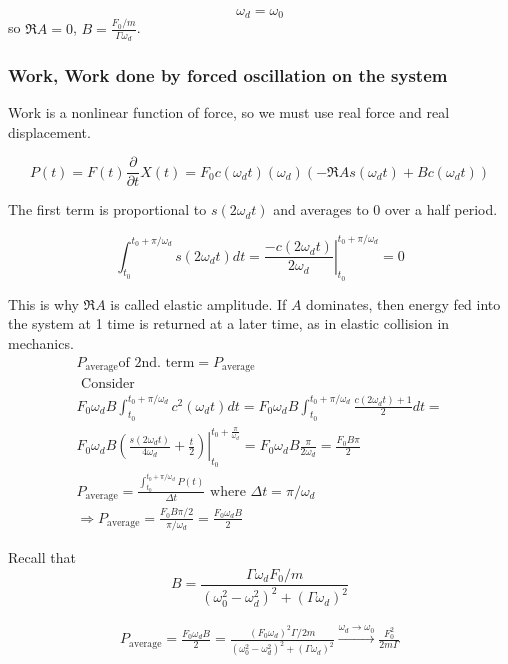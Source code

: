 \documentclass[10pt]{amsart}
\begin{document}
\begin{multicols*}{2}
\[
\omega_d = \omega_0
\]
so $\Re{A} = 0$, $B = \frac{ F_0 / m}{ \Gamma \omega_d}$.

\subsubsection{Work, Work done by forced oscillation on the system}

Work is a nonlinear function of force, so we must use real force and real displacement.

\[
P(t) = F(t) \frac{\partial }{\partial t} X(t) = F_0 c(\omega_d t) (\omega_d) (-\Re{A} s(\omega_d t) + B c(\omega_d t))
\]

The first term is proportional to $s(2\omega_d t)$ and averages to 0 over a half period.

\[
\int_{t_0}^{t_0 + \pi / \omega_d} s(2\omega_d t) dt = \left. \frac{ -c(2\omega_d t) }{2 \omega_d } \right|_{t_0}^{t_0 + \pi /\omega_d} = 0
\]

This is why $\Re{A}$ is called elastic amplitude. If $A$ dominates, then energy fed into the system at 1 time is returned at a later time, as in elastic collision in mechanics.
\[
\begin{gathered}
	P_{\text{average}} \text{of 2nd. term} = P_{\text{average}} \\
	\text{ Consider } \\
	F_0 \omega_d B \int_{t_0}^{t_0 + \pi/ \omega_d} c^2 (\omega_d t) dt = F_0 \omega_d B \int_{t_0}^{t_0 + \pi/ \omega_d} \frac{ c(2\omega_d t) + 1}{2} dt = \\
	F_0 \omega_d B \left. \left( \frac{ s(2\omega_d t) }{ 4 \omega_d } + \frac{t}{2} \right) \right|_{t_0}^{t_0 + \frac{\pi}{\omega_d} } = F_0 \omega_d B \frac{\pi}{2\omega_d} = \frac{F_0 B\pi}{2} \\
	P_{\text{average}} = \frac{ \int_{t_0}^{t_0 + \pi / \omega_d} P(t) }{ \Delta t}  \text{ where } \Delta t = \pi / \omega_d \\
	\Longrightarrow P_{\text{average}} = \frac{ F_0 B\pi /2}{ \pi / \omega_d}  = \boxed{ \frac{F_0 \omega_d B}{2} }
\end{gathered}
\]

Recall that
\[
B = \frac{ \Gamma \omega_d F_0 /m }{ (\omega_0^2 - \omega_d^2)^2 + (\Gamma \omega_d)^2 }
\]

\[
\begin{gathered}
	P_{\text{average}} = \frac{F_0 \omega_d B}{2} = \frac{ (F_0 \omega_d)^2 \Gamma /2m }{ (\omega_0^2 - \omega_d^2)^2 + (\Gamma \omega_d)^2 } \xrightarrow{ \omega_d\to \omega_0} \frac{F_0^2}{ 2m \Gamma}
\end{gathered}
\]


\end{multicols*}
\end{document}
